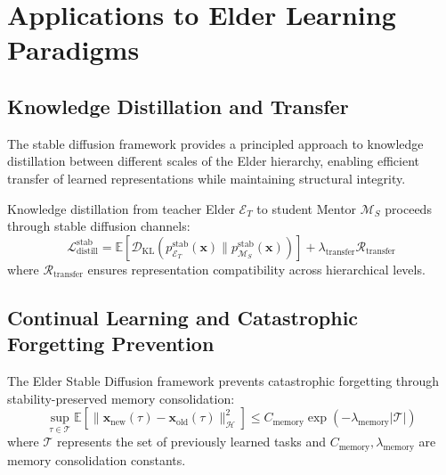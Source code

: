 \section{Applications to Elder Learning Paradigms}

\subsection{Knowledge Distillation and Transfer}

The stable diffusion framework provides a principled approach to knowledge distillation between different scales of the Elder hierarchy, enabling efficient transfer of learned representations while maintaining structural integrity.

\begin{definition}
Knowledge distillation from teacher Elder $\mathcal{E}_T$ to student Mentor $\mathcal{M}_S$ proceeds through stable diffusion channels:
\begin{equation}
\mathcal{L}_{\text{distill}}^{\text{stab}} = \mathbb{E}\left[\mathcal{D}_{\text{KL}}(p_{\mathcal{E}_T}^{\text{stab}}(\mathbf{x}) \| p_{\mathcal{M}_S}^{\text{stab}}(\mathbf{x}))\right] + \lambda_{\text{transfer}} \mathcal{R}_{\text{transfer}}
\end{equation}
where $\mathcal{R}_{\text{transfer}}$ ensures representation compatibility across hierarchical levels.
\end{definition}

\subsection{Continual Learning and Catastrophic Forgetting Prevention}

\begin{theorem}
The Elder Stable Diffusion framework prevents catastrophic forgetting through stability-preserved memory consolidation:
\begin{equation}
\sup_{\tau \in \mathcal{T}} \mathbb{E}\left[\|\mathbf{x}_{\text{new}}(\tau) - \mathbf{x}_{\text{old}}(\tau)\|_{\mathcal{H}}^2\right] \leq C_{\text{memory}} \exp(-\lambda_{\text{memory}} |\mathcal{T}|)
\end{equation}
where $\mathcal{T}$ represents the set of previously learned tasks and $C_{\text{memory}}, \lambda_{\text{memory}}$ are memory consolidation constants.
\end{theorem}

